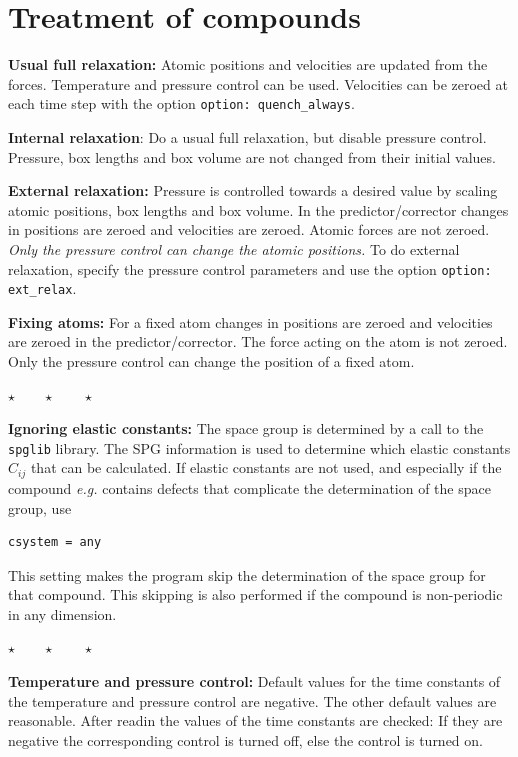 \documentclass[a4paper,12pt,pdftex,onecolumn]{article}
\newcommand{\eg}{\emph{e.g.}\xspace}
\newcommand{\stars}{\begin{center}%
\vspace{1em plus 0.5em minus 0.5em}%
$\star \qquad \star \qquad \star$%
\vspace{1em plus 0.5em minus 0.5em}%
\end{center}}
\begin{document}
\section{Treatment of compounds}
\label{sec:comptreat}

\textbf{Usual full relaxation:} Atomic positions and
velocities are updated from the forces.
Temperature and pressure control can be used.
Velocities can be zeroed at each time step with the option \verb+option: quench_always+.

\textbf{Internal relaxation}: Do a usual full relaxation, but disable pressure control.
Pressure, box lengths and box volume are not changed from their initial values.

\textbf{External relaxation:} Pressure is controlled towards a desired value by scaling
atomic positions, box lengths and box volume.
In the predictor/corrector changes in positions are zeroed and velocities are zeroed.
Atomic forces are not zeroed.
\textit{Only the pressure control can change the atomic positions.}
To do external relaxation, specify the pressure control parameters and use the
option \verb+option: ext_relax+.

\textbf{Fixing atoms:} For a fixed atom
changes in positions are zeroed and velocities are zeroed
in the predictor/corrector.
The force acting on the atom is not zeroed.
Only the pressure control can change the position of a fixed atom.

\stars

\textbf{Ignoring elastic constants:}
The space group is determined by a call to the \verb+spglib+ library.
The SPG information is used to determine which elastic constants $C_{ij}$ that can be
calculated. If elastic constants are not used, and especially if the compound \eg
contains defects that complicate the determination of the space group, use

\begin{Verbatim}[fontsize=\relsize{-1},frame=single]
csystem = any
\end{Verbatim}

This setting makes the program skip the determination of the space group for that
compound. This skipping is also performed if the compound is non-periodic in any
dimension.


\stars

\textbf{Temperature and pressure control:}
Default values for the time constants of the temperature and pressure control are negative.
The other default values are reasonable.
After readin the values of the time constants are checked: If they are negative the
corresponding control is turned off, else the control is turned on.
\end{document}

